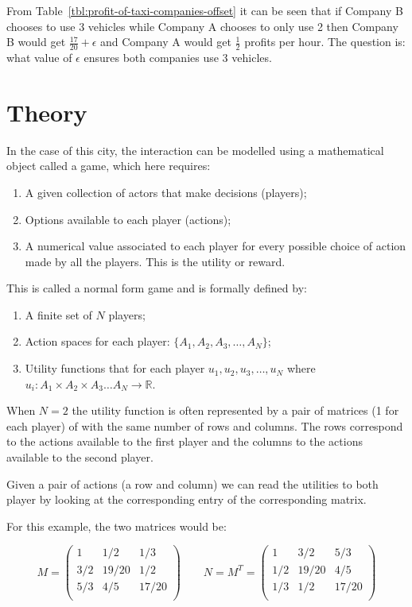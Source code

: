 From Table~\ref{tbl:profit-of-taxi-companies-offset} it can be seen that if Company B
chooses to use 3 vehicles while Company A chooses to only use 2 then Company B
would get \(\frac{17}{20} + \epsilon\) and Company A would get \(\frac{1}{2}\)
profits per hour. The question is: what value of \(\epsilon\) ensures both
companies use 3 vehicles.

\section{Theory}\label{sec:game_theory_theory}

In the case of this city, the interaction can be modelled using a mathematical
object called a game, which here requires:

\begin{enumerate}
    \item A given collection of actors that make decisions (players);
    \item Options available to each player (actions);
    \item A numerical value associated to each player for every possible
        choice of action made by all the players. This is the utility or reward.
\end{enumerate}

This is called a normal form game and is formally defined by:

\begin{enumerate}
    \item A finite set of \(N\) players;
    \item Action spaces for each player: \(\{A_1, A_2, A_3, \dots, A_N\}\);
    \item Utility functions that for each player \(u_1, u_2, u_3, \dots, u_N\)
        where \(u_i:A_1\times A_2 \times A_3 \dots A_N \to \mathbb{R}\).
\end{enumerate}

When \(N=2\) the utility function is often represented by a pair of matrices (1
for each player) of with the same number of rows and columns. The rows
correspond to the actions available to the first player and the columns to the
actions available to the second player.

Given a pair of actions (a row and column) we can read the utilities to both
player by looking at the corresponding entry of the corresponding matrix.

For this example, the two matrices would be:

\[
   M =
        \begin{pmatrix}
            1     & 1 / 2   & 1 / 3 \\
            3 / 2 & 19 / 20 & 1 / 2 \\
            5 / 3 & 4 / 5   & 17 / 20\\
        \end{pmatrix}
   \qquad
   N = M ^T =
        \begin{pmatrix}
            1     & 3 / 2   & 5 / 3 \\
            1 / 2 & 19 / 20 & 4 / 5 \\
            1 / 3 & 1 / 2   & 17 / 20\\
        \end{pmatrix}
\]

